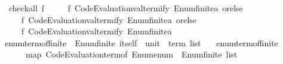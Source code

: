 \begin{isabellebody}
\isanewline
\isanewline
{}\isamarkupfalse%
\isanewline
\ \ {\isachardoublequoteopen}check{\isacharunderscore}{\kern0pt}all\ f\ {\isacharequal}{\kern0pt}\isanewline
\ \ \ \ {\isacharparenleft}{\kern0pt}f\ {\isacharparenleft}{\kern0pt}Code{\isacharunderscore}{\kern0pt}Evaluation{\isachardot}{\kern0pt}valtermify\ Enum{\isachardot}{\kern0pt}finite{\isacharunderscore}{\kern0pt}{}{\isachardot}{\kern0pt}a\ orelse\isanewline
\ \ \ \ \ f\ {\isacharparenleft}{\kern0pt}Code{\isacharunderscore}{\kern0pt}Evaluation{\isachardot}{\kern0pt}valtermify\ Enum{\isachardot}{\kern0pt}finite{\isacharunderscore}{\kern0pt}{}{\isachardot}{\kern0pt}a\ orelse\isanewline
\ \ \ \ \ f\ {\isacharparenleft}{\kern0pt}Code{\isacharunderscore}{\kern0pt}Evaluation{\isachardot}{\kern0pt}valtermify\ Enum{\isachardot}{\kern0pt}finite{\isacharunderscore}{\kern0pt}{}{\isachardot}{\kern0pt}a\isanewline
\isanewline
{}\isamarkupfalse%
\ enum{\isacharunderscore}{\kern0pt}term{\isacharunderscore}{\kern0pt}of{\isacharunderscore}{\kern0pt}finite{\isacharunderscore}{\kern0pt}{}\ {\isacharcolon}{\kern0pt}{\isacharcolon}{\kern0pt}\ {\isachardoublequoteopen}Enum{\isachardot}{\kern0pt}finite{\isacharunderscore}{\kern0pt}{}\ itself\ {\isasymRightarrow}\ unit\ {\isasymRightarrow}\ term\ list{\isachardoublequoteclose}\isanewline
\ \ \ {\isachardoublequoteopen}enum{\isacharunderscore}{\kern0pt}term{\isacharunderscore}{\kern0pt}of{\isacharunderscore}{\kern0pt}finite{\isacharunderscore}{\kern0pt}{}\ {\isacharequal}{\kern0pt}\isanewline
\ \ \ \ {\isacharparenleft}{\kern0pt}{\isasymlambda}{\isacharunderscore}{\kern0pt}\ {\isacharunderscore}{\kern0pt}{\isachardot}{\kern0pt}\ map\ Code{\isacharunderscore}{\kern0pt}Evaluation{\isachardot}{\kern0pt}term{\isacharunderscore}{\kern0pt}of\ {\isacharparenleft}{\kern0pt}Enum{\isachardot}{\kern0pt}enum\ {\isacharcolon}{\kern0pt}{\isacharcolon}{\kern0pt}\ Enum{\isachardot}{\kern0pt}finite{\isacharunderscore}{\kern0pt}{}\ list{\isacharparenright}{\kern0pt}{\isacharparenright}{\kern0pt}{\isachardoublequoteclose}\isanewline
\isanewline
{}\isamarkupfalse%
%
\isadelimproof
\ %
\endisadelimproof
%
\isatagproof
\isacommand{{\isachardot}{\kern0pt}{\isachardot}{\kern0pt}}\isamarkupfalse%

\end{isabellebody}
